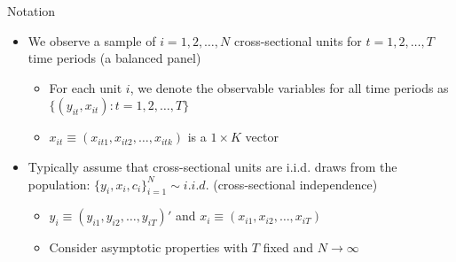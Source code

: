 \documentclass{beamer}
\begin{document}
\begin{frame}{Notation}

\begin{itemize}
	\item We observe a sample of $i=1,2,\dots,N$ cross-sectional units for $t=1,2,\dots,T$ time periods (a balanced panel)
		\begin{itemize}
		\item For each unit $i$, we denote the observable variables for all time periods as $\{(y_{it},x_{it}):t=1,2,\dots,T\}$
		\item $x_{it}\equiv(x_{it1},x_{it2}, \dots, x_{itk})$ is a $1\times K$ vector
		\end{itemize}
	\item Typically assume that cross-sectional units are i.i.d. draws from the population: $\{y_i, x_i, c_i\}^N_{i=1}\sim i.i.d.$ (cross-sectional independence)
		\begin{itemize}
		\item $y_i \equiv (y_{i1}, y_{i2}, \dots, y_{iT})'$ and $x_i \equiv (x_{i1},x_{i2}, \dots, x_{iT})$
		\item Consider asymptotic properties with $T$ fixed and $N\rightarrow \infty$
		\end{itemize}
\end{itemize}

\end{frame}
\end{document}
